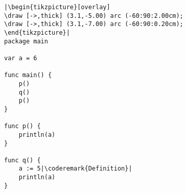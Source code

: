 \begin{lstlisting}[caption=Local scope,label=src:scope1]
|\begin{tikzpicture}[overlay]
\draw [->,thick] (3.1,-5.00) arc (-60:90:2.00cm);
\draw [->,thick] (3.1,-7.00) arc (-60:90:0.20cm);
\end{tikzpicture}|
package main

var a = 6

func main() {
    p()
    q()
    p()
}

func p() {
    println(a)
}

func q() {
    a := 5|\coderemark{Definition}|
    println(a)
}
\end{lstlisting}
